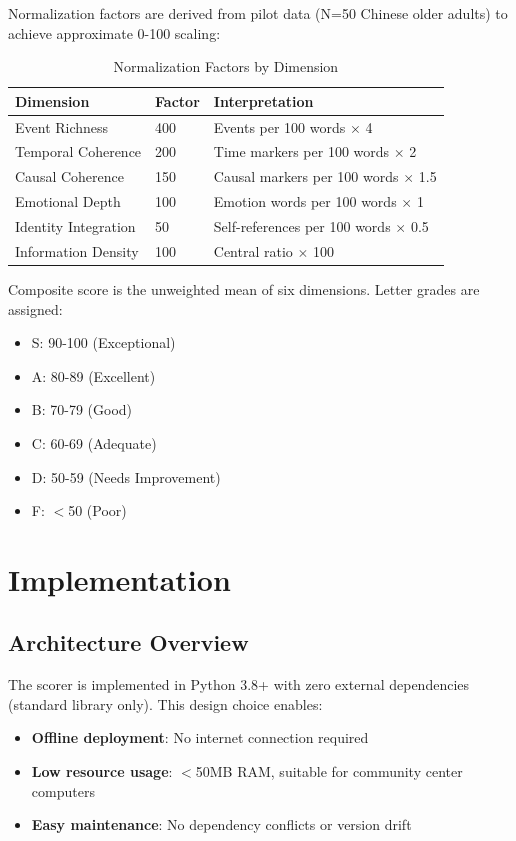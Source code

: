 \documentclass{article}
\begin{document}
Normalization factors are derived from pilot data (N=50 Chinese older adults) to achieve approximate 0-100 scaling:

\begin{table}[h]
\centering
\caption{Normalization Factors by Dimension}
\label{tab:normalization}
\begin{tabular}{lll}
\toprule
\textbf{Dimension} & \textbf{Factor} & \textbf{Interpretation} \\
\midrule
Event Richness & 400 & Events per 100 words $\times$ 4 \\
Temporal Coherence & 200 & Time markers per 100 words $\times$ 2 \\
Causal Coherence & 150 & Causal markers per 100 words $\times$ 1.5 \\
Emotional Depth & 100 & Emotion words per 100 words $\times$ 1 \\
Identity Integration & 50 & Self-references per 100 words $\times$ 0.5 \\
Information Density & 100 & Central ratio $\times$ 100 \\
\bottomrule
\end{tabular}
\end{table}

Composite score is the unweighted mean of six dimensions. Letter grades are assigned:
\begin{itemize}
    \item S: 90-100 (Exceptional)
    \item A: 80-89 (Excellent)
    \item B: 70-79 (Good)
    \item C: 60-69 (Adequate)
    \item D: 50-59 (Needs Improvement)
    \item F: $<$50 (Poor)
\end{itemize}

\section{Implementation}

\subsection{Architecture Overview}

The scorer is implemented in Python 3.8+ with zero external dependencies (standard library only). This design choice enables:
\begin{itemize}
    \item \textbf{Offline deployment}: No internet connection required
    \item \textbf{Low resource usage}: $<$50MB RAM, suitable for community center computers
    \item \textbf{Easy maintenance}: No dependency conflicts or version drift
\end{itemize}
\end{document}
